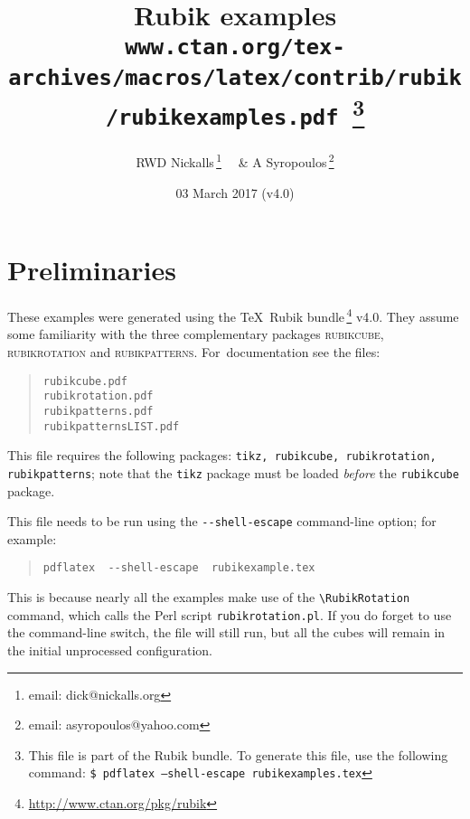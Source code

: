 \documentclass[a4paper]{article}
\begin{document}
\ifpdf{}\fi
\title{Rubik examples\\ 
\smallskip\normalsize\texttt{www.ctan.org/tex-archives/macros/latex/contrib/rubik/rubikexamples.pdf}
\,\footnote{This file is part of the Rubik bundle. To generate this file, 
use the following command: \newline \texttt{\$ pdflatex --shell-escape  rubikexamples.tex}}}
\author{RWD Nickalls\,\footnote{email: \textsf{dick@nickalls.org}}%
  \ \ \& A Syropoulos\,\footnote{email: \textsf{asyropoulos@yahoo.com}}}
\date{03 March 2017 (v4.0)}
\maketitle


\section{Preliminaries}


These  examples  were generated using  the \TeX\ 
Rubik bundle\,\footnote{\url{http://www.ctan.org/pkg/rubik}} v4.0. They assume some  
familiarity with the three complementary packages \textsc{rubikcube}, 
\textsc{rubikrotation} and \textsc{rubikpatterns}. For~documentation see the files:

\begin{quote}
\begin{verbatim}
rubikcube.pdf
rubikrotation.pdf
rubikpatterns.pdf
rubikpatternsLIST.pdf
\end{verbatim}
\end{quote}


This file requires the following packages: \texttt{tikz, rubikcube, rubikrotation,
rubikpatterns}; note that the \texttt{tikz} package must be loaded \textit{before} 
the \texttt{rubikcube} package.

This file needs to be run using  the \verb!--shell-escape! command-line option; 
for example:
\begin{quote}
\begin{verbatim}
pdflatex  --shell-escape  rubikexample.tex
\end{verbatim}
\end{quote}
This is because nearly all the examples  make use of the  \verb!\RubikRotation! 
command, which  calls the Perl script  \texttt{rubikrotation.pl}.  
If you do forget to use the command-line switch, the file will still run, but 
all the cubes will remain in the initial unprocessed configuration. 
\end{document}
